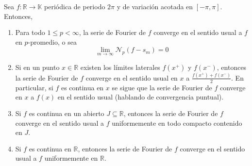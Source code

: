 \documentclass[12pt]{report}
\theoremstyle{largebreak}
\renewcommand{\leq}{\ensuremath{\leqslant}}
\newcommand\cf[3]{\ensuremath{#1:#2\rightarrow#3}}
\newcommand{\N}[2]{\ensuremath{\mathcal{N}_{#1}\left(#2\right)}}
\begin{document}
    \begin{theor}
        Sea $\cf{f}{\mathbb{R}}{\mathbb{K}}$ periódica de periodo $2\pi$ y de variación acotada en $[-\pi,\pi]$. Entonces,
        \begin{enumerate}
            \item Para todo $1\leq p<\infty$, la serie de Fourier de $f$ converge en el sentido usual a $f$ en $p$-promedio, o sea
            \begin{equation*}
                \lim_{ m\rightarrow\infty}\N{p}{f-s_m}=0
            \end{equation*}
            \item Si en un punto $x\in\mathbb{R}$ existen los límites laterales $f(x^+)$ y $f(x^-)$, entonces la serie de Fourier de $f$ converge en el sentido usual en $x$ a $\frac{f(x^+)+f(x^-)}{2}$. En particular, si $f$ es continua en $x$ se sigue que la serie de Fourier de $f$ converge en $x$ a $f(x)$ en el sentido usual (hablando de convergencia puntual).
            \item Si $f$ es continua en un abierto $J\subseteq\mathbb{R}$, entonces la serie de Fourier de $f$ converge en el sentido usual a $f$ uniformemente en todo compacto contenido en $J$.
            \item Si $f$ es continua en $\mathbb{R}$, entonces la serie de Fourier de $f$ converge en el sentido usual a $f$ uniformemente en $\mathbb{R}$.
        \end{enumerate}
    \end{theor}
\end{document}
